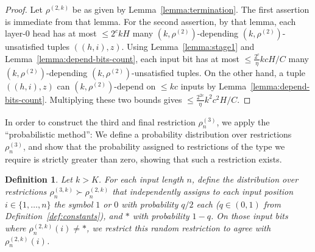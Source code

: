 \documentclass[11pt,letterpaper]{article}
\newcounter{theorem}
\newtheorem{defin}[theorem]{Definition}
\begin{document}
\begin{proof}
Let $\rho^{(2,k)}$ be as given by Lemma~\ref{lemma:termination}.
The first assertion is immediate from that lemma.
For the second assertion, by that lemma, each layer-0 head has at most $\leq 2^c kH$ many $(k,\rho^{(2)})$-depending $(k,\rho^{(2)})$-unsatisfied tuples $((h,i),z)$.
Using Lemma~\ref{lemma:stage1} and Lemma~\ref{lemma:depend-bits-count}, each input bit has at most $\leq \frac{2^c}{\eta}kcH/C$ many $(k,\rho^{(2)})$-depending $(k,\rho^{(2)})$-unsatisfied tuples.
On the other hand, a tuple $((h,i),z)$ can $(k,\rho^{(2)})$-depend on  $\leq k c$ inputs by Lemma~\ref{lemma:depend-bits-count}.
Multiplying these two bounds gives $\leq \frac{2^{2c}}{\eta}k^2c^2H/C$.
\end{proof}


In order to construct the third and final restriction $\rho^{(3)}_n$, we apply the ``probabilistic method'': We define a probability distribution over restrictions $\rho^{(3)}_n$, and show that the probability assigned to restrictions of the type we require is strictly greater than zero, showing that such a restriction exists.

\begin{defin}
Let $k > K$.
For each input length $n$, define the distribution over restrictions $\rho_n^{(3,k)} \succ \rho_n^{(2,k)}$ that independently assigns to each input position $i \in \{1, \dots, n\}$ the symbol $1$ or $0$ with probability $q/2$ each ($q \in (0,1)$ from Definition~\ref{def:constants}), and $*$ with probability $1-q$.
On those input bits where $\rho_n^{(2,k)}(i) \neq *$, we restrict this random restriction to agree with $\rho_n^{(2,k)}(i)$.
\end{defin}
\end{document}
